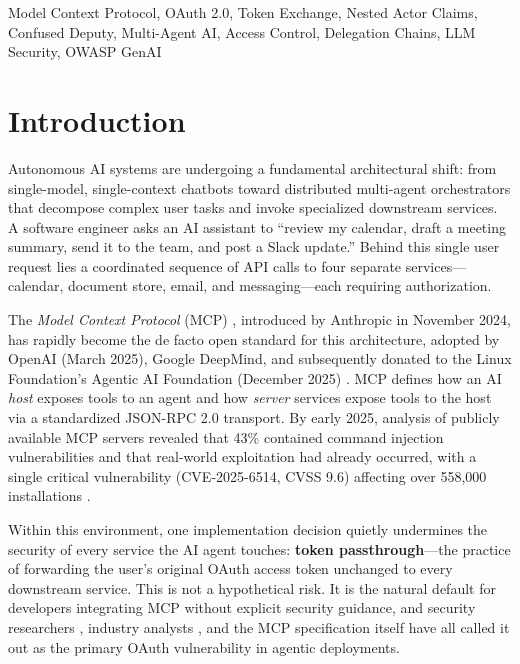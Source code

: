 \documentclass[journal]{IEEEtran}
\begin{document}
\begin{IEEEkeywords}
Model Context Protocol, OAuth 2.0, Token Exchange, Nested Actor Claims, Confused Deputy, Multi-Agent AI, Access Control, Delegation Chains, LLM Security, OWASP GenAI
\end{IEEEkeywords}


\section{Introduction}
\label{sec:introduction}

Autonomous AI systems are undergoing a fundamental architectural shift: from single-model, single-context chatbots toward distributed multi-agent orchestrators that decompose complex user tasks and invoke specialized downstream services. A software engineer asks an AI assistant to ``review my calendar, draft a meeting summary, send it to the team, and post a Slack update.'' Behind this single user request lies a coordinated sequence of API calls to four separate services—calendar, document store, email, and messaging—each requiring authorization.

The \textit{Model Context Protocol} (MCP) \cite{mcp_spec}, introduced by Anthropic in November 2024, has rapidly become the de facto open standard for this architecture, adopted by OpenAI (March 2025), Google DeepMind, and subsequently donated to the Linux Foundation's Agentic AI Foundation (December 2025) \cite{mcp_wiki}. MCP defines how an AI \textit{host} exposes tools to an agent and how \textit{server} services expose tools to the host via a standardized JSON-RPC 2.0 transport. By early 2025, analysis of publicly available MCP servers revealed that 43\% contained command injection vulnerabilities and that real-world exploitation had already occurred, with a single critical vulnerability (CVE-2025-6514, CVSS 9.6) affecting over 558,000 installations \cite{mcp_sec_medium_2025}.

Within this environment, one implementation decision quietly undermines the security of every service the AI agent touches: \textbf{token passthrough}—the practice of forwarding the user's original OAuth access token unchanged to every downstream service. This is not a hypothetical risk. It is the natural default for developers integrating MCP without explicit security guidance, and security researchers \cite{cosai_mcp}, industry analysts \cite{checkmarx_mcp}, and the MCP specification itself \cite{mcp_security} have all called it out as the primary OAuth vulnerability in agentic deployments.
\end{document}
